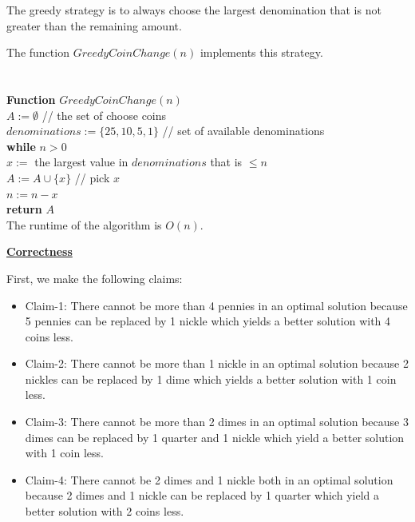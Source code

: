 \documentclass[11pt]{article}
\begin{document}
\begin{enumerate}
\begin{enumerate}
The greedy strategy is to always choose the largest denomination that
is not greater than the remaining amount.

The function $GreedyCoinChange(n)$ implements this strategy.\\\\\\

\textbf{Function} $GreedyCoinChange(n)$\\
\-\hspace{3em} $A := \emptyset$ // the set of choose coins \\
\-\hspace{3em} $denominations := \{25,10,5,1\}$ // set of
available denominations \\
\-\hspace{3em} \textbf{while} $n > 0$\\
\-\hspace{5em} $x := $ the largest value in $denominations$ that is
$\leq n$ \\
\-\hspace{5em} $A := A \cup \{x\}$ // pick $x$\\
\-\hspace{5em} $n := n - x$\\
\-\hspace{3em} \textbf{return} $A$\\

The runtime of the algorithm is $O(n)$.

\underline{\textbf{Correctness}}

First, we make the following claims:
\begin{itemize}
\item Claim-1: There cannot be more than 4 pennies in an optimal
  solution because 5 pennies can be replaced by 1 nickle which yields
  a better solution with 4 coins less.
\item Claim-2: There cannot be more than 1 nickle in an optimal
  solution because 2 nickles can be replaced by 1 dime which yields
  a better solution with 1 coin less.
\item Claim-3: There cannot be more than 2 dimes in an optimal
  solution because 3 dimes can be replaced by 1 quarter and 1 nickle
  which yield a better solution with 1 coin less.
\item Claim-4: There cannot be 2 dimes and 1 nickle both in an optimal
  solution because 2 dimes and 1 nickle can be replaced by 1 quarter
  which yield a better solution with 2 coins less.
\end{itemize}


\end{enumerate}
\end{enumerate}
\end{document}
